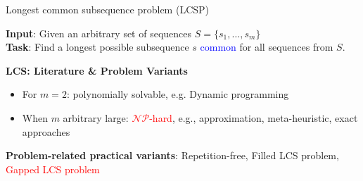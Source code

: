 \documentclass{beamer}
\begin{document}
\begin{frame}{Longest common subsequence problem (LCSP)}
   
    
    \begin{definition}[LCSP]
        \textbf{Input}: Given an arbitrary set of sequences $S=\{s_1, \ldots, s_m\}$ \\
        \textbf{Task}: Find a longest possible  subsequence $s$  \textcolor{blue}{common} for all sequences from $S$. %
    \end{definition} \vspace{0.5cm}
  
 \textbf{LCS: Literature \& Problem Variants }
  \begin{itemize}
  \item For $m=2$: polynomially solvable, e.g. {Dynamic programming} %
 \vspace{0.2cm}
  \item When $m$ arbitrary large:   \textcolor{red}{$\mathcal{NP}$-hard}, e.g.,  approximation, meta-heuristic, exact approaches   
  \end{itemize}\vspace{0.5cm}
  
  \textbf{Problem-related practical variants}:    Repetition-free, Filled LCS problem, \textcolor{red}{Gapped LCS problem}
\end{frame}
\end{document}
